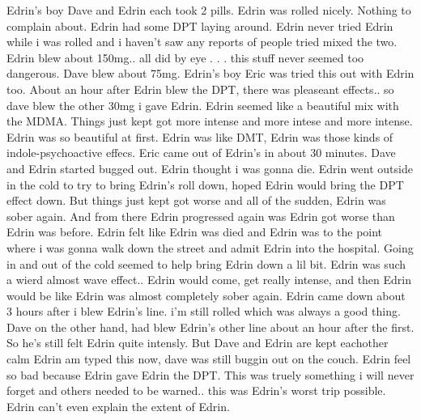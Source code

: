 \documentclass[12pt]{book}
\begin{document}
Edrin's boy Dave and Edrin each took 2 pills. Edrin was rolled nicely. Nothing to complain about. Edrin had some DPT laying around. Edrin never tried Edrin while i was rolled and i haven't saw any reports of people tried mixed the two. Edrin blew about 150mg.. all did by eye . . .  this stuff never seemed too dangerous. Dave blew about 75mg. Edrin's boy Eric was tried this out with Edrin too. About an hour after Edrin blew the DPT, there was pleaseant effects.. so dave blew the other 30mg i gave Edrin. Edrin seemed like a beautiful mix with the MDMA. Things just kept got more intense and more intese and more intense. Edrin was so beautiful at first. Edrin was like DMT, Edrin was those kinds of indole-psychoactive effecs. Eric came out of Edrin's in about 30 minutes. Dave and Edrin started bugged out. Edrin thought i was gonna die. Edrin went outside in the cold to try to bring Edrin's roll down, hoped Edrin would bring the DPT effect down. But things just kept got worse and all of the sudden, Edrin was sober again. And from there Edrin progressed again was Edrin got worse than Edrin was before. Edrin felt like Edrin was died and Edrin was to the point where i was gonna walk down the street and admit Edrin into the hospital. Going in and out of the cold seemed to help bring Edrin down a lil bit. Edrin was such a wierd almost wave effect.. Edrin would come, get really intense, and then Edrin would be like Edrin was almost completely sober again. Edrin came down about 3 hours after i blew Edrin's line. i'm still rolled which was always a good thing. Dave on the other hand, had blew Edrin's other line about an hour after the first. So he's still felt Edrin quite intensly. But Dave and Edrin are kept eachother calm Edrin am typed this now, dave was still buggin out on the couch. Edrin feel so bad because Edrin gave Edrin the DPT. This was truely something i will never forget and others needed to be warned.. this was Edrin's worst trip possible. Edrin can't even explain the extent of Edrin.
\end{document}
